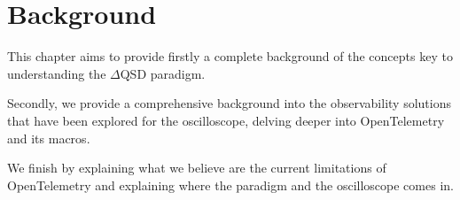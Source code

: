 \chapter{Background}
    This chapter aims to provide firstly a complete background of the concepts key to understanding the $\Delta$QSD paradigm.

    Secondly, we provide a comprehensive background into the observability solutions that have been explored for the oscilloscope, delving deeper into OpenTelemetry and its macros.
    
    We finish by explaining what we believe are the current limitations of OpenTelemetry and explaining where the paradigm and the oscilloscope comes in.
    
    
    
    

